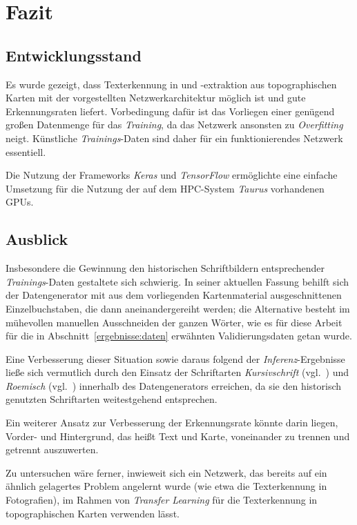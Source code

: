 \section{Fazit}

\subsection{Entwicklungsstand}

Es wurde gezeigt, dass Texterkennung in und -extraktion aus topographischen Karten mit der vorgestellten
Netzwerkarchitektur möglich ist und gute Erkennungsraten liefert. Vorbedingung dafür ist das Vorliegen einer genügend
großen Datenmenge für das \textit{Training}, da das Netzwerk ansonsten zu \textit{Overfitting} neigt. Künstliche
\textit{Trainings}-Daten sind daher für ein funktionierendes Netzwerk essentiell.

Die Nutzung der Frameworks \textit{Keras} und \textit{TensorFlow} ermöglichte eine einfache Umsetzung für die Nutzung
der auf dem HPC-System \textit{Taurus} vorhandenen GPUs.

\subsection{Ausblick}

Insbesondere die Gewinnung den historischen Schriftbildern entsprechender \textit{Trainings}-Daten gestaltete sich
schwierig. In seiner aktuellen Fassung behilft sich der Datengenerator mit aus dem vorliegenden Kartenmaterial
ausgeschnittenen Einzelbuchstaben, die dann aneinandergereiht werden; die Alternative besteht im mühevollen manuellen
Ausschneiden der ganzen Wörter, wie es für diese Arbeit für die in Abschnitt~\ref{ergebnisse:daten} erwähnten
Validierungsdaten getan wurde.

Eine Verbesserung dieser Situation sowie daraus folgend der \textit{Inferenz}-Ergebnisse ließe sich vermutlich durch
den Einsatz der Schriftarten \textit{Kursivschrift} (vgl.~\cite{kursivschrift}) und \textit{Roemisch}
(vgl.~\cite{roemisch}) innerhalb des Datengenerators erreichen, da sie den historisch genutzten Schriftarten
weitestgehend entsprechen.

Ein weiterer Ansatz zur Verbesserung der Erkennungsrate könnte darin liegen, Vorder- und Hintergrund, das heißt Text
und Karte, voneinander zu trennen und getrennt auszuwerten.

Zu untersuchen wäre ferner, inwieweit sich ein Netzwerk, das bereits auf ein ähnlich gelagertes Problem angelernt
wurde (wie etwa die Texterkennung in Fotografien), im Rahmen von \textit{Transfer Learning} für die Texterkennung in
topographischen Karten verwenden lässt.

